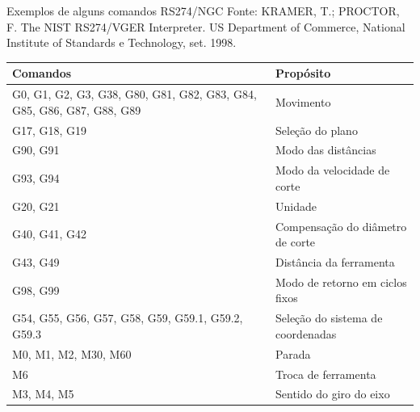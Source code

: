 \documentclass[aspectratio=169]{beamer}
\begin{document}
{\begin{frame}{Exemplos de alguns comandos RS274/NGC}
  \scriptsize{Fonte: KRAMER, T.; PROCTOR, F. 
    The NIST RS274/VGER Interpreter. US Department of
    Commerce, National Institute of Standards e Technology, set. 1998.}

  \begin{table}[H]
    \centering
    \begin{tabular}{p{7cm}|p{5cm}}
    
      \hline
      \bfseries{\scriptsize{Comandos}} & \bfseries{\scriptsize{Prop\'osito}} \\
  
      \hline
      \scriptsize{G0, G1, G2, G3, G38, G80, G81, G82, G83, G84, G85, G86, G87, G88, G89} 
      & \scriptsize{Movimento} \\
  
      \hline
      \scriptsize{G17, G18, G19} 
      & \scriptsize{Sele\c c\~ao do plano} \\
  
      \hline
      \scriptsize{G90, G91}
      & \scriptsize{Modo das dist\^ancias} \\
  
      \hline
      \scriptsize{G93, G94}
      & \scriptsize{Modo da velocidade de corte} \\
  
      \hline
      \scriptsize{G20, G21}
      & \scriptsize{Unidade} \\
  
      \hline
      \scriptsize{G40, G41, G42}
      & \scriptsize{Compensa\c c\~ao do di\^ametro de corte} \\
  
      \hline
      \scriptsize{G43, G49}
      & \scriptsize{Dist\^ancia da ferramenta} \\
  
      \hline
      \scriptsize{G98, G99}
      & \scriptsize{Modo de retorno em ciclos fixos} \\
  
      \hline
      \scriptsize{G54, G55, G56, G57, G58, G59, G59.1, G59.2, G59.3}
      & \scriptsize{Sele\c c\~ao do sistema de coordenadas} \\
  
      \hline
      \scriptsize{M0, M1, M2, M30, M60}
      & \scriptsize{Parada} \\
  
      \hline
      \scriptsize{M6}
      & \scriptsize{Troca de ferramenta} \\
  
      \hline
      \scriptsize{M3, M4, M5}
      & \scriptsize{Sentido do giro do eixo} \\
  

\end{tabular}
\end{table}
\end{frame}}
\end{document}
